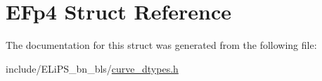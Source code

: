 \hypertarget{struct_e_fp4}{}\section{E\+Fp4 Struct Reference}
\label{struct_e_fp4}


The documentation for this struct was generated from the following file\+:\begin{DoxyCompactItemize}
\item 
include/\+E\+Li\+P\+S\+\_\+bn\+\_\+bls/\hyperlink{curve__dtypes_8h}{curve\+\_\+dtypes.\+h}\end{DoxyCompactItemize}
